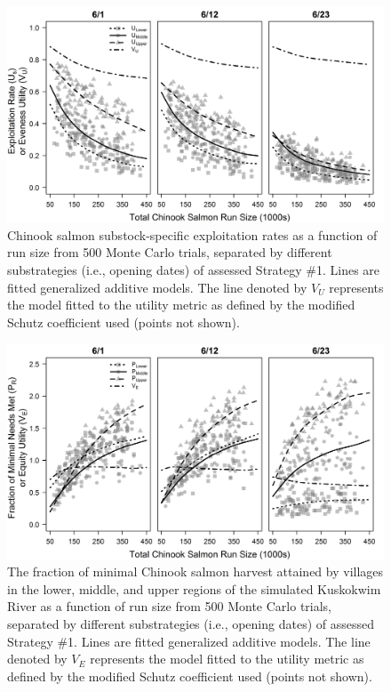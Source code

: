 \documentclass[12pt,]{book}
\theoremstyle{definition}
\theoremstyle{definition}
\theoremstyle{definition}
\theoremstyle{remark}
\begin{document}
\begin{singlespace}
\clearpage
\begin{figure}
  \centering
  \includegraphics{img/Ch3/U-v-N.jpg}
  \caption{Chinook salmon substock-specific exploitation rates as a function of run size from 500 Monte Carlo trials, separated by different substrategies (i.e., opening dates) of assessed Strategy \#1. Lines are fitted generalized additive models. The line denoted by $V_U$ represents the model fitted to the utility metric as defined by the modified Schutz coefficient used (points not shown).}
  \label{fig:U-v-N}
\end{figure}

\clearpage
\begin{figure}
  \centering
  \includegraphics{img/Ch3/pNeed-v-N.jpg}
  \caption{The fraction of minimal Chinook salmon harvest attained by villages in the lower, middle, and upper regions of the simulated Kuskokwim River as a function of run size from 500 Monte Carlo trials, separated by different substrategies (i.e., opening dates) of assessed Strategy \#1. Lines are fitted generalized additive models. The line denoted by $V_E$ represents the model fitted to the utility metric as defined by the modified Schutz coefficient used (points not shown).}
  \label{fig:pNeed-v-N}
\end{figure}


\end{singlespace}
\end{document}
